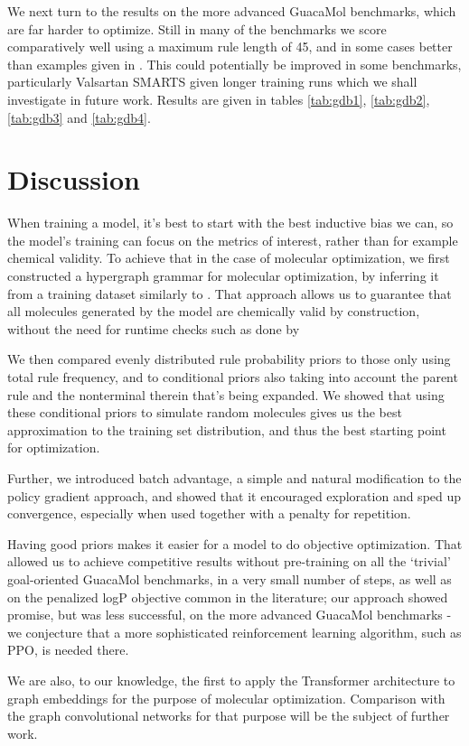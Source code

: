 \documentclass{article}
\begin{document}
We next turn to the results on the more advanced GuacaMol benchmarks, which are far harder to optimize. Still in many of the benchmarks we score comparatively well using a maximum rule length of 45, and in some cases better than examples given in \cite{brown2019}. This could potentially be improved in some benchmarks, particularly Valsartan SMARTS given longer training runs which we shall investigate in future work. Results are given in tables \ref{tab:gdb1}, \ref{tab:gdb2}, \ref{tab:gdb3} and \ref{tab:gdb4}.

\section{Discussion}
When training a model, it's best to start with the best inductive bias we can, so the model's training can focus on the metrics of interest, rather than for example chemical validity. To achieve that in the case of molecular optimization, we first constructed a hypergraph grammar for molecular optimization, by inferring it from a training dataset similarly to \cite{kajino2018}. That approach allows us to guarantee that all molecules generated by the model are chemically valid by construction, without the need for runtime checks such as done by \cite{you2018}

We then compared evenly distributed rule probability priors to those only using total rule frequency, and to conditional priors also taking into account the parent rule and the nonterminal therein that's being expanded. We showed that using these conditional priors to simulate random molecules gives us the best approximation to the training set distribution, and thus the best starting point for optimization.

Further, we introduced batch advantage, a simple and natural modification to the policy gradient approach, and showed that it encouraged exploration and sped up convergence, especially when used together with a penalty for repetition.

Having good priors makes it easier for a model to do objective optimization. That allowed us to achieve competitive results without pre-training on all the `trivial' goal-oriented GuacaMol benchmarks, in a very small number of steps, as well as on the penalized logP objective common in the literature;  our approach showed promise, but was less successful, on the more advanced GuacaMol benchmarks - we conjecture that a more sophisticated reinforcement learning algorithm, such as PPO, is needed there.

We are also, to our knowledge, the first to apply the Transformer architecture to graph embeddings for the purpose of molecular optimization. Comparison with the graph convolutional networks for that purpose will be the subject of further work.
\pagebreak

\medskip

\small
 

\end{document}
